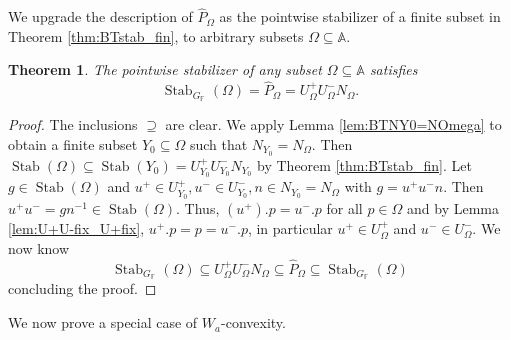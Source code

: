 \documentclass[12pt]{amsart}
\newcommand{\F}{\mathbb{F} }
\newcommand{\A}{\mathbb{A}}
\numberwithin{equation}{section}
\newtheorem{theorem}{Theorem}[section]
\theoremstyle{remark} %
\begin{document}
		We upgrade the description of $\hat{P}_{\Omega}$ as the pointwise stabilizer of a finite subset in Theorem \ref{thm:BTstab_fin}, to arbitrary subsets $\Omega \subseteq \A$. 
		\begin{theorem}\label{thm:BTstab}
			The pointwise stabilizer of any subset $\Omega \subseteq \A$ satisfies
			$$
			\operatorname{Stab}_{G_\F}(\Omega) = \hat{P}_\Omega = U_\Omega^+ U_{\Omega}^- N_{\Omega} .
			$$
		\end{theorem}
		\begin{proof} The inclusions $\supseteq$ are clear. We apply Lemma \ref{lem:BTNY0=NOmega} to obtain a finite subset $Y_0 \subseteq \Omega$ such that $N_{Y_0} = N_{\Omega}$. Then $\operatorname{Stab}(\Omega) \subseteq \operatorname{Stab}(Y_0) = U_{Y_0}^+ U_{Y_0}^- N_{Y_0}$ by Theorem \ref{thm:BTstab_fin}. Let $g\in \operatorname{Stab}(\Omega)$ and $u^+ \in U_{Y_0}^+, u^- \in  U_{Y_0}^-, n \in N_{Y_0} = N_\Omega$ with $g=u^+u^-n$. Then $u^+ u^- = gn^{-1} \in \operatorname{Stab}(\Omega)$. Thus, $(u^+).p = u^-.p$ for all $p\in \Omega$ and by Lemma \ref{lem:U+U-fix_U+fix}, $u^+.p = p = u^-.p$, in particular $u^+ \in U_\Omega^+$ and $u^- \in U_{\Omega}^-$. We now know
			$$
			\operatorname{Stab}_{G_\F}(\Omega) \subseteq U_\Omega^+ U_\Omega^- N_\Omega \subseteq \hat{P}_\Omega \subseteq \operatorname{Stab}_{G_\F}(\Omega)
			$$
			concluding the proof.
		\end{proof}
		We now prove a special case of $W_a$-convexity.
		
\end{document}
